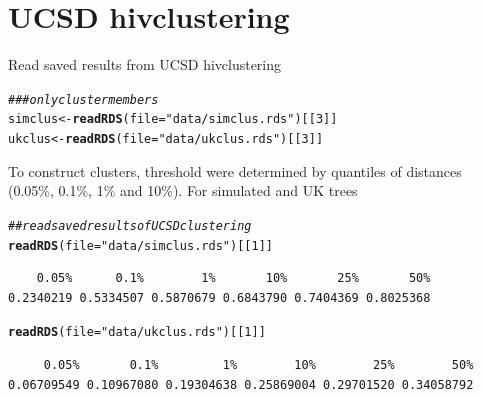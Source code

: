 \documentclass[]{revtex4}\usepackage[]{graphicx}\usepackage[]{color}
\makeatletter
\newcommand{\hlnum}[1]{\textcolor[rgb]{0.686,0.059,0.569}{#1}}%
\newcommand{\hlstr}[1]{\textcolor[rgb]{0.192,0.494,0.8}{#1}}%
\newcommand{\hlcom}[1]{\textcolor[rgb]{0.678,0.584,0.686}{\textit{#1}}}%
\newcommand{\hlstd}[1]{\textcolor[rgb]{0.345,0.345,0.345}{#1}}%
\newcommand{\hlkwb}[1]{\textcolor[rgb]{0.69,0.353,0.396}{#1}}%
\newcommand{\hlkwc}[1]{\textcolor[rgb]{0.333,0.667,0.333}{#1}}%
\newcommand{\hlkwd}[1]{\textcolor[rgb]{0.737,0.353,0.396}{\textbf{#1}}}%
\newenvironment{kframe}{%
 \def\at@end@of@kframe{}%
 \ifinner\ifhmode%
  \def\at@end@of@kframe{\end{minipage}}%
  \begin{minipage}{\columnwidth}%
 \fi\fi%
 \def\FrameCommand##1{\hskip\@totalleftmargin \hskip-\fboxsep
 \colorbox{shadecolor}{##1}\hskip-\fboxsep
     \hskip-\linewidth \hskip-\@totalleftmargin \hskip\columnwidth}%
 \MakeFramed {\advance\hsize-\width
   \@totalleftmargin\z@ \linewidth\hsize
   \@setminipage}}%
 {\par\unskip\endMakeFramed%
 \at@end@of@kframe}
\newenvironment{knitrout}{}{} %
\makeatother
\begin{document}
\section{UCSD hivclustering}
Read saved results from UCSD \textsf{hivclustering}
\begin{knitrout}
\color{fgcolor}\begin{kframe}
\begin{alltt}
\hlcom{### only cluster members}
\hlstd{simclus} \hlkwb{<-} \hlkwd{readRDS}\hlstd{(}\hlkwc{file} \hlstd{=} \hlstr{"data/simclus.rds"}\hlstd{)[[}\hlnum{3}\hlstd{]]}
\hlstd{ukclus} \hlkwb{<-} \hlkwd{readRDS}\hlstd{(}\hlkwc{file} \hlstd{=} \hlstr{"data/ukclus.rds"}\hlstd{)[[}\hlnum{3}\hlstd{]]}
\end{alltt}
\end{kframe}
\end{knitrout}


To construct clusters, threshold were determined by quantiles of distances (0.05\%, 0.1\%, 1\% and 10\%). For simulated and UK trees
\begin{knitrout}
\color{fgcolor}\begin{kframe}
\begin{alltt}
\hlcom{## read saved results of UCSD clustering}
\hlkwd{readRDS}\hlstd{(}\hlkwc{file} \hlstd{=} \hlstr{"data/simclus.rds"}\hlstd{)[[}\hlnum{1}\hlstd{]]}
\end{alltt}
\begin{verbatim}
    0.05%      0.1%        1%       10%       25%       50% 
0.2340219 0.5334507 0.5870679 0.6843790 0.7404369 0.8025368 
\end{verbatim}
\begin{alltt}
\hlkwd{readRDS}\hlstd{(}\hlkwc{file} \hlstd{=} \hlstr{"data/ukclus.rds"}\hlstd{)[[}\hlnum{1}\hlstd{]]}
\end{alltt}
\begin{verbatim}
     0.05%       0.1%         1%        10%        25%        50% 
0.06709549 0.10967080 0.19304638 0.25869004 0.29701520 0.34058792 
\end{verbatim}
\end{kframe}
\end{knitrout}
\end{document}
